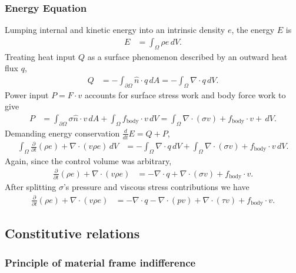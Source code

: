 \documentclass[letterpaper,11pt,nointlimits]{amsart}
\begin{document}
\subsubsection{Energy Equation} 
Lumping internal and kinetic energy into an intrinsic density $e$, 
the energy $E$ is
\begin{align}
  E &= \int_{\Omega} \rho{}e \, dV 
  .
\end{align}
Treating heat input $Q$ as a surface phenomenon described by an outward
heat flux $q$, 
\begin{align}
  Q 
  &= 
  -\int_{\partial\Omega}\hat{n}\cdot{}q\,dA
  =
  -\int_{\Omega}\nabla\cdot{}q\,dV
  .
\end{align}
Power input $P=F\cdot{}v$ accounts for surface stress work and body force work
to give
\begin{align}
  P 
  &= 
    \int_{\partial\Omega} \sigma{}\hat{n} \cdot{} v \, dA 
  + \int_{\Omega} f_\text{body} \cdot{} v \, dV 
  = \int_{\Omega} \nabla\cdot(\sigma{v}) + f_\text{body} \cdot{} v + \, dV 
  .
\end{align}
Demanding energy conservation $\frac{d}{dt}E=Q+P$,
\begin{align}
\int_{\Omega}\frac{\partial}{\partial{}t} \left( \rho{}e \right)
  +
  \nabla\cdot\left(v\rho{}e\right)
\,dV
&=
  - \int_{\Omega}\nabla\cdot{}q\,dV
  + \int_{\Omega} \nabla\cdot(\sigma{}v) + f_\text{body} \cdot{} v \, dV 
  .
\end{align}
Again, since the control volume was arbitrary, 
\begin{align}
  \frac{\partial}{\partial{}t}\left(\rho{}e\right)
  +
  \nabla\cdot\left(v\rho{}e\right)
&=
  - \nabla\cdot{}q + \nabla\cdot(\sigma{}v) + f_\text{body} \cdot{} v 
  .
\end{align}
After splitting $\sigma$'s pressure and viscous stress contributions we have
\begin{align}
  \label{eq:cons_energy}
  \frac{\partial}{\partial{}t}\left(\rho{}e\right)
  +
  \nabla\cdot\left(v\rho{}e\right)
&=
  - \nabla\cdot{}q 
  - \nabla\cdot{}(pv)
  + \nabla\cdot{}(\tau{}v)
  + f_\text{body} \cdot{} v 
  .
\end{align}

\subsection{Constitutive relations}

\subsubsection{Principle of material frame indifference}
\end{document}
